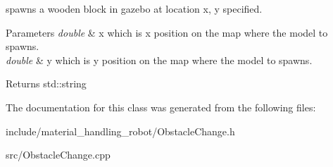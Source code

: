 spawns a wooden block in gazebo at location x, y specified. 


\begin{DoxyParams}{Parameters}
{\em double} & x which is x position on the map where the model to spawns. \\
\hline
{\em double} & y which is y position on the map where the model to spawns. \\
\hline
\end{DoxyParams}
\begin{DoxyReturn}{Returns}
std\+::string 
\end{DoxyReturn}


The documentation for this class was generated from the following files\+:\begin{DoxyCompactItemize}
\item 
include/material\+\_\+handling\+\_\+robot/Obstacle\+Change.\+h\item 
src/Obstacle\+Change.\+cpp\end{DoxyCompactItemize}
